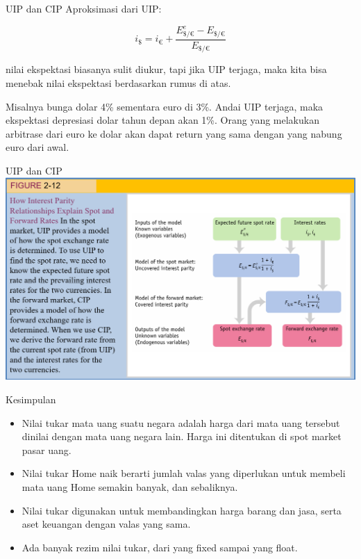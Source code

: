 \documentclass[
  ignorenonframetext,
]{beamer}
\begin{document}
\begin{frame}{UIP dan CIP}
\label{uip-dan-cip-2}
Aproksimasi dari UIP:

\[
i_\$=i_{€}+\frac{E_{\$/€}^e-E_{\$/€}}{E_{\$/€}}
\]

nilai ekspektasi biasanya sulit diukur, tapi jika UIP terjaga, maka kita
bisa menebak nilai ekspektasi berdasarkan rumus di atas.

Misalnya bunga dolar 4\% sementara euro di 3\%. Andai UIP terjaga, maka
ekspektasi depresiasi dolar tahun depan akan 1\%. Orang yang melakukan
arbitrase dari euro ke dolar akan dapat return yang sama dengan yang
nabung euro dari awal.
\end{frame}

\begin{frame}{UIP dan CIP}
\label{uip-dan-cip-3}
\includegraphics{pic5.png}
\end{frame}

\begin{frame}{Kesimpulan}
\label{kesimpulan}
\begin{itemize}
\item
  Nilai tukar mata uang suatu negara adalah harga dari mata uang
  tersebut dinilai dengan mata uang negara lain. Harga ini ditentukan di
  spot market pasar uang.
\item
  Nilai tukar Home naik berarti jumlah valas yang diperlukan untuk
  membeli mata uang Home semakin banyak, dan sebaliknya.
\item
  Nilai tukar digunakan untuk membandingkan harga barang dan jasa, serta
  aset keuangan dengan valas yang sama.
\item
  Ada banyak rezim nilai tukar, dari yang fixed sampai yang float.
\end{itemize}
\end{frame}
\end{document}
